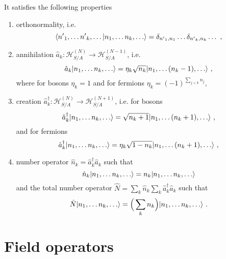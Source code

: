     It satisfies the following properties 
    \begin{enumerate}
        \item orthonormality, i.e. 
            \begin{equation*}
                \langle{n'}_1, \ldots {n'}_k, \ldots\vert n_1, \ldots n_k, \ldots\rangle = \delta_{{n'}_1, n_1} \ldots \delta_{{n'}_k, n_k} \ldots  ~,
            \end{equation*}
        \item annihilation $\hat a_k \colon \mathcal H^{(N)}_{S/A} \rightarrow \mathcal H^{(N-1)}_{S/A}$, i.e.
            \begin{equation*}
                \hat a_k \vert n_1, \ldots n_k, \ldots\rangle = \eta_k \sqrt{n_k} \vert n_1, \ldots (n_k - 1), \ldots\rangle ~,
            \end{equation*}
            where for bosons $\eta_k = 1$ and for fermions $\eta_k = (-1)^{\sum_{j < k} n_j}$,
        \item creation $\hat a_k^\dagger \colon \mathcal H^{(N)}_{S/A} \rightarrow \mathcal H^{(N+1)}_{S/A}$, i.e. for bosons
            \begin{equation*}
                \hat a^\dagger_k \vert n_1, \ldots n_k, \ldots\rangle = \sqrt{n_k + 1} \vert n_1, \ldots (n_k + 1), \ldots\rangle ~,
            \end{equation*}
            and for fermions
            \begin{equation*}
                \hat a^\dagger_k \vert n_1, \ldots n_k, \ldots\rangle = \eta_k \sqrt{1 - n_k} \vert n_1, \ldots (n_k + 1), \ldots\rangle ~,
            \end{equation*}
        \item number operator $\hat n_k = \hat a_k^\dagger \hat a_k$ such that 
            \begin{equation*}
                \hat n_k \vert n_1, \ldots n_k, \ldots\rangle = n_k \vert n_1, \ldots n_k, \ldots\rangle
            \end{equation*}
        and the total number operator $\hat N = \sum_k \hat n_k \sum_k \hat a^\dagger_k \hat a_k$ such that 
        \begin{equation*}
            \hat N \vert n_1, \ldots n_k, \ldots\rangle = \Big (\sum_k n_k \Big ) \vert n_1, \ldots n_k, \ldots\rangle ~.
        \end{equation*}
    \end{enumerate}

\section{Field operators} 

